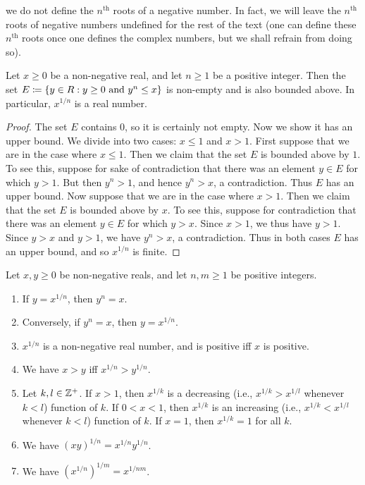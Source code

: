 \begin{note}
  we do not define the \(n^{\text{th}}\) roots of a negative number.
  In fact, we will leave the \(n^{\text{th}}\) roots of negative numbers undefined for the rest of the text
  (one can define these \(n^{\text{th}}\) roots once one defines the complex numbers, but we shall refrain from doing so).
\end{note}

\begin{lem}\label{i:5.6.5}
  Let \(x \geq 0\) be a non-negative real, and let \(n \geq 1\) be a positive integer.
  Then the set \(E \coloneqq \left\lbrace y \in R : y \geq 0 \text{ and } y^n \leq x\right\rbrace\) is non-empty and is also bounded above.
  In particular, \(x^{1 / n}\) is a real number.
\end{lem}

\begin{proof}
  The set \(E\) contains \(0\), so it is certainly not empty.
  Now we show it has an upper bound.
  We divide into two cases: \(x \leq 1\) and \(x > 1\).
  First suppose that we are in the case where \(x \leq 1\).
  Then we claim that the set \(E\) is bounded above by \(1\).
  To see this, suppose for sake of contradiction that there was an element \(y \in E\) for which \(y > 1\).
  But then \(y^n > 1\), and hence \(y^n > x\), a contradiction.
  Thus \(E\) has an upper bound.
  Now suppose that we are in the case where \(x > 1\).
  Then we claim that the set \(E\) is bounded above by \(x\).
  To see this, suppose for contradiction that there was an element \(y \in E\) for which \(y > x\).
  Since \(x > 1\), we thus have \(y > 1\).
  Since \(y > x\) and \(y > 1\), we have \(y^n > x\), a contradiction.
  Thus in both cases \(E\) has an upper bound, and so \(x^{1 / n}\) is finite.
\end{proof}

\begin{lem}\label{i:5.6.6}
  Let \(x, y \geq 0\) be non-negative reals, and let \(n, m \geq 1\) be positive integers.
  \begin{enumerate}
    \item If \(y = x^{1 / n}\), then \(y^n = x\).
    \item Conversely, if \(y^n = x\), then \(y = x^{1 / n}\).
    \item \(x^{1 / n}\) is a non-negative real number, and is positive iff \(x\) is positive.
    \item We have \(x > y\) iff \(x^{1 / n} > y^{1 / n}\).
    \item Let \(k, l \in \mathbb{Z}^+\).
          If \(x > 1\), then \(x^{1 / k}\) is a decreasing (i.e., \(x^{1 / k} > x^{1 / l}\) whenever \(k < l\)) function of \(k\).
          If \(0 < x < 1\), then \(x^{1 / k}\) is an increasing (i.e., \(x^{1 / k} < x^{1 / l}\) whenever \(k < l\)) function of \(k\).
          If \(x = 1\), then \(x^{1 / k} = 1\) for all \(k\).
    \item We have \((xy)^{1 / n} = x^{1 / n} y^{1 / n}\).
    \item We have \((x^{1 / n})^{1 / m} = x^{1 / nm}\).
  \end{enumerate}
\end{lem}

